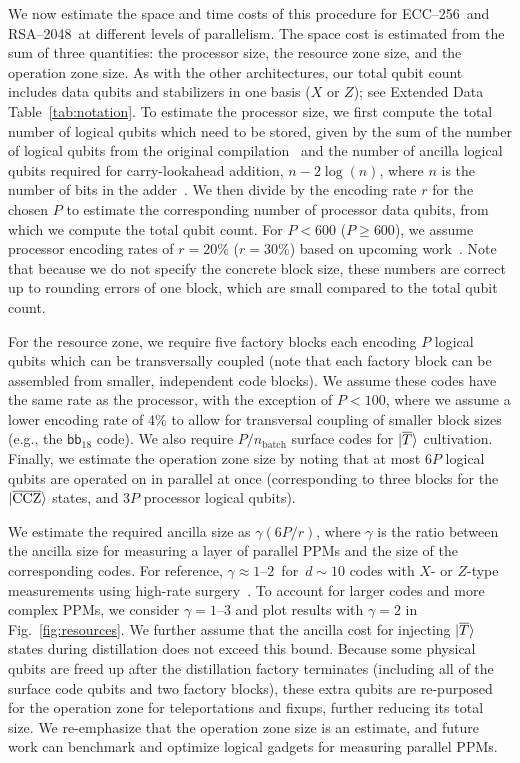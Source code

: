 \documentclass[reprint,twocolumn,secnumarabic,amssymb, aps, prx]{revtex4-2}
\newcommand{\bb}{\mbox{$\mathsf{bb}_{18}$}}
\newcommand{\ecc}{\mbox{ECC--256}}
\newcommand{\rsa}{\mbox{RSA--2048}}
\newcommand{\lket}[1]{\ket{\overline{#1}}}
\newcommand{\ccz}{\ket{\overline{\text{CCZ}}}}
\begin{document}
We now estimate the space and time costs of this procedure for \ecc\ and \rsa\ at different levels of parallelism. The space cost is estimated from the sum of three quantities: the processor size, the resource zone size, and the operation zone size. As with the other architectures, our total qubit count includes data qubits and stabilizers in one basis ($X$ or $Z$); see Extended Data Table~\ref{tab:notation}. To estimate the processor size, we first compute the total number of logical qubits which need to be stored, given by the sum of the number of logical qubits from the original compilation~\cite{gidney2019how, babbush2026quantum} and the number of ancilla logical qubits required for carry-lookahead addition, $n-2\log(n)$, where $n$ is the number of bits in the adder~\cite{draper2004logarithmic}. We then divide by the encoding rate $r$ for the chosen $P$ to estimate the corresponding number of processor data qubits, from which we compute the total qubit count. For $P<600$ ($P\geq600$), we assume processor encoding rates of $r=20\%$ ($r=30$\%) based on upcoming work~\cite{caltech2026codeatlas}. Note that because we do not specify the concrete block size, these numbers are correct up to rounding errors of one block, which are small compared to the total qubit count.

For the resource zone, we require five factory blocks each encoding $P$ logical qubits which can be transversally coupled (note that each factory block can be assembled from smaller, independent code blocks). We assume these codes have the same rate as the processor, with the exception of $P<100$, where we assume a lower encoding rate of 4\% to allow for transversal coupling of smaller block sizes (e.g., the $\bb$ code). We also require $P/n_\text{batch}$ surface codes for $\lket{T}$ cultivation. Finally, we estimate the operation zone size by noting that at most $6P$ logical qubits are operated on in parallel at once (corresponding to three blocks for the $\ccz$ states, and 3$P$ processor logical qubits). 

We estimate the required ancilla size as $\gamma (6P/r)$, where $\gamma$ is the ratio between the ancilla size for measuring a layer of parallel PPMs and the size of the corresponding codes. For reference, \mbox{$\gamma \approx 1$–$2$ for \mbox{$d\sim 10$}} codes with $X$- or $Z$-type measurements using high-rate surgery~\cite{zheng2025high}. To account for larger codes and more complex PPMs, we consider \mbox{$\gamma = 1$–$3$} and plot results with \mbox{$\gamma = 2$} in Fig.~\ref{fig:resources}. We further assume that the ancilla cost for injecting $\lket{T}$ states during distillation does not exceed this bound. Because some physical qubits are freed up after the distillation factory terminates (including all of the surface code qubits and two factory blocks), these extra qubits are re-purposed for the operation zone for teleportations and fixups, further reducing its total size. We re-emphasize that the operation zone size is an estimate, and future work can benchmark and optimize logical gadgets for measuring parallel PPMs.
\end{document}
